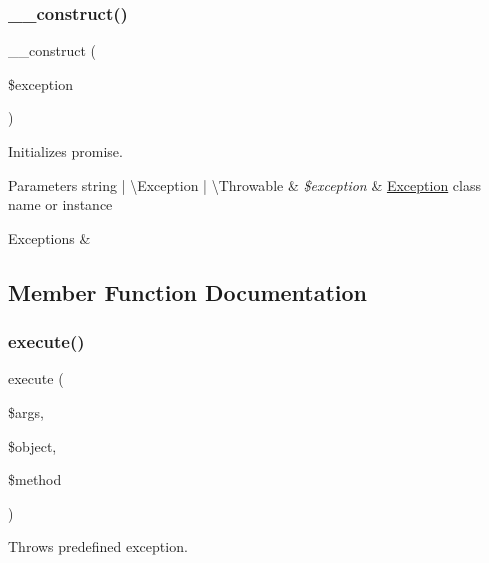 \subsubsection{\texorpdfstring{\+\_\+\+\_\+construct()}{\_\_construct()}}
{\footnotesize\ttfamily \+\_\+\+\_\+construct (\begin{DoxyParamCaption}\item[{}]{\$exception }\end{DoxyParamCaption})}

Initializes promise.


\begin{DoxyParams}[1]{Parameters}
string | \textbackslash{}\+Exception | \textbackslash{}\+Throwable & {\em \$exception} & \mbox{\hyperlink{namespace_prophecy_1_1_exception}{Exception}} class name or instance\\
\hline
\end{DoxyParams}

\begin{DoxyExceptions}{Exceptions}
{\em } & \\
\hline
\end{DoxyExceptions}


\subsection{Member Function Documentation}
\mbox{\label{class_prophecy_1_1_promise_1_1_throw_promise_a2b8542872672f9ac4ed0c942f931f0c6}} 
\subsubsection{\texorpdfstring{execute()}{execute()}}
{\footnotesize\ttfamily execute (\begin{DoxyParamCaption}\item[{array}]{\$args,  }\item[{\mbox{\hyperlink{class_prophecy_1_1_prophecy_1_1_object_prophecy}{Object\+Prophecy}}}]{\$object,  }\item[{\mbox{\hyperlink{class_prophecy_1_1_prophecy_1_1_method_prophecy}{Method\+Prophecy}}}]{\$method }\end{DoxyParamCaption})}

Throws predefined exception.


